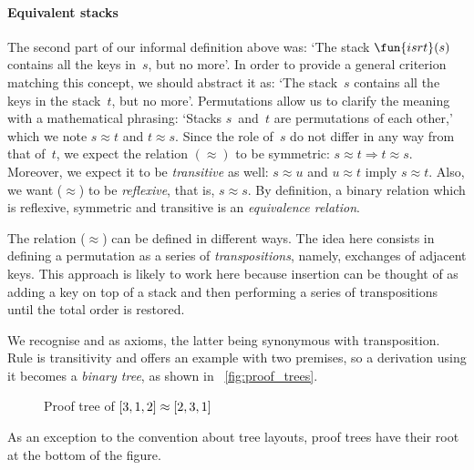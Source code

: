 \paragraph{Equivalent stacks}

The second part of our informal definition above was: `The stack
\(\fun{isrt}(s)\) contains all the keys
in~\(s\), but no more'.  In order to provide a general criterion
matching this concept, we should abstract it as: `The stack~\(s\)
contains all the keys in the stack~\(t\), but no more'. Permutations
allow us to clarify the meaning with a mathematical phrasing: `Stacks
\(s\)~and~\(t\) are permutations of each other,' which we note \(s
\approx t\) and \(t \approx s\). Since the role of~\(s\) do not differ
in any way from that of~\(t\), we expect the relation \((\approx)\) to
be symmetric: \(s \approx t \Rightarrow t \approx s\). Moreover, we
expect it to be \emph{transitive} as well: \(s \approx u\) and \(u
\approx t\) imply \(s \approx t\). Also, we want (\(\approx\)) to be
\emph{reflexive}, that is, \(s \approx s\). By definition, a binary
relation which is reflexive, symmetric and transitive is an
\emph{equivalence relation}.

The relation (\(\approx\)) can be defined in different ways. The idea
here consists in defining a permutation as a series of
\emph{transpositions}, namely, exchanges of
adjacent keys. This approach is likely to work here because insertion
can be thought of as adding a key on top of a stack and then
performing a series of transpositions until the total order is
restored.
We recognise  and  as axioms, the latter
being synonymous with transposition. Rule  is
transitivity and offers an example with two premises, so a derivation
using it becomes a \emph{binary tree}, as shown in
\fig~\vref{fig:proof_trees}.
\begin{figure}
\centering
{}
\qquad
{}
\caption{Proof tree of \({[}3,1,2{]} \protect\approx {[}2,3,1{]}\)}
\label{fig:proof_trees}
\end{figure}
As an exception to the convention about tree layouts, proof
trees have their root at the bottom of the
figure.

